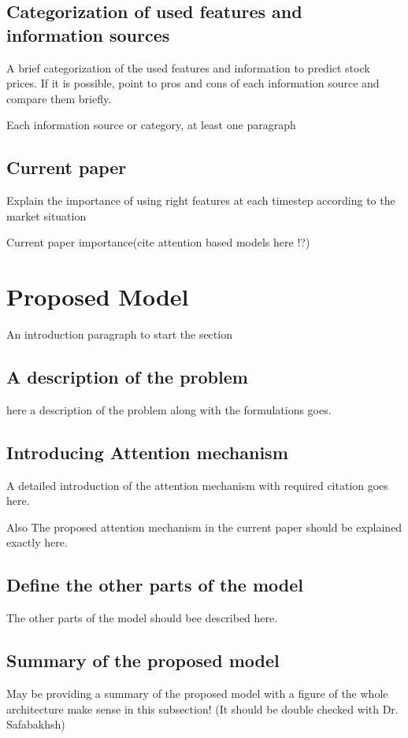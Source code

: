\documentclass[12pt,journal,compsoc]{IEEEtran}
\begin{document}
\subsection{Categorization of used features and information sources}
A brief categorization of the used features and information to predict stock prices. If it is possible, point to pros and cons of each information source and compare them briefly.

Each information source or category, at least one paragraph


\subsection{Current paper}
Explain the importance of using right features at each timestep according to the  market situation

Current paper importance(cite attention based models here !?)


\section{Proposed Model}
An introduction paragraph to start the section

\subsection{A description of the problem}
here a description of the problem along with the formulations goes.


\subsection{Introducing Attention mechanism}
A detailed introduction of the attention mechanism with required citation goes here.

Also The proposed attention mechanism in the current paper should be explained exactly here.

\subsection{Define the other parts of the model}
The other parts of the model should bee described here.

\subsection{Summary of the proposed model}
May be providing a summary of the proposed model with a figure of the whole architecture make sense in this subsection! (It should be double checked with Dr. Safabakhsh)
\end{document}
